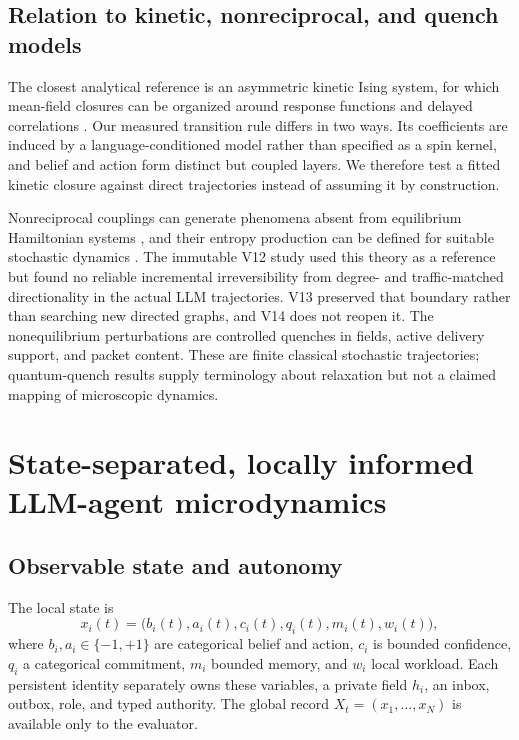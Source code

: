 \documentclass[12pt]{article}
\begin{document}
\subsection{Relation to kinetic, nonreciprocal, and quench models}

The closest analytical reference is an asymmetric kinetic Ising system, for
which mean-field closures can be organized around response functions and
delayed correlations \cite{aguilera2021}. Our measured transition rule differs
in two ways. Its coefficients are induced by a language-conditioned model
rather than specified as a spin kernel, and belief and action form distinct
but coupled layers. We therefore test a fitted kinetic closure against direct
trajectories instead of assuming it by construction.

Nonreciprocal couplings can generate phenomena absent from equilibrium
Hamiltonian systems \cite{fruchart2021}, and their entropy production can be
defined for suitable stochastic dynamics \cite{zhang2023}. The immutable V12
study used this theory as a reference but found no reliable incremental
irreversibility from degree- and traffic-matched directionality in the actual
LLM trajectories. V13 preserved that boundary rather than searching new
directed graphs, and V14 does not reopen it. The nonequilibrium perturbations
are controlled quenches in fields, active delivery support, and packet content. These are
finite classical stochastic trajectories; quantum-quench results
\cite{calabrese2006} supply terminology about relaxation but not a claimed
mapping of microscopic dynamics.

\section{State-separated, locally informed LLM-agent microdynamics}

\subsection{Observable state and autonomy}

The local state is
\begin{equation}
x_i(t)=\bigl(b_i(t),a_i(t),c_i(t),q_i(t),m_i(t),w_i(t)\bigr),
\end{equation}
where $b_i,a_i\in\{-1,+1\}$ are categorical belief and action, $c_i$ is
bounded confidence, $q_i$ a categorical commitment, $m_i$ bounded memory, and
$w_i$ local workload. Each persistent identity separately owns these variables,
a private field $h_i$, an inbox, outbox, role, and typed authority. The global
record $X_t=(x_1,\ldots,x_N)$ is available only to the evaluator.
\end{document}
